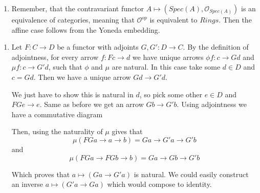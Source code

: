 \begin{exercise}{3}
    \begin{enumerate}
        \item Remember, that the 
        contravariant functor
         $A\mapsto (Spec(A),\mathcal{O}_{Spec(A)})$
         is an equivalence of categories, meaning that 
         $\mathcal{O}^{op}$ is equivalent to $Rings$. Then
         the affine case follows from the Yoneda embedding.

    \end{enumerate}
\end{exercise}

\begin{exercise}{4}
    \begin{enumerate}
        \item{Let $F \colon C \rightarrow D$ be a functor with adjoints $G, G'
            \colon D \rightarrow C$. By the definition of adjointness, for every
            arrow $f \colon Fc \rightarrow d$ we have unique arrows $\phi f
            \colon c \rightarrow Gd$ and $\mu f \colon c \rightarrow G'd$, such
            that $\phi$ and $\mu$ are natural. In this case take some $d \in D$
            and $c = Gd$. Then we have a unique arrow $Gd \rightarrow G'd$.

            We just have to show this is natural in $d$, so pick some other $e
            \in D$ and $FGe \rightarrow e$. Same as before we get an arrow $Gb
            \rightarrow G'b$. Using adjointness we have a commutative diagram


            Then, using the naturality of $\mu$ gives that
            \begin{equation*}
                \mu(FGa \rightarrow a \rightarrow b) = Ga \rightarrow G'a
                \rightarrow G'b
            \end{equation*}
            and
            \begin{equation*}
                \mu(FGa \rightarrow FGb \rightarrow b) = Ga \rightarrow Gb
                \rightarrow G'b
            \end{equation*}

            Which proves that $a \mapsto (Ga \rightarrow G'a)$ is natural.
            We could easily construct an inverse $a \mapsto (G'a \rightarrow
            Ga)$ which would compose to identity.}


\end{enumerate}
\end{exercise}
